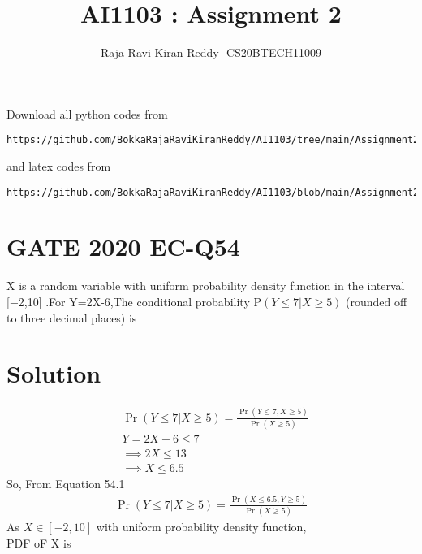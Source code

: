 \documentclass[journal,12pt,twocolumn]{IEEEtran}
\begin{document}
\let\vec\mathbf
\renewcommand{\thefigure}{\theproblem}
\def\putbox#1#2#3{\makebox[0in][l]{\makebox[#1][l]{}\raisebox{\baselineskip}[0in][0in]{\raisebox{#2}[0in][0in]{#3}}}}
     \def\rightbox#1{\makebox[0in][r]{#1}}
     \def\centbox#1{\makebox[0in]{#1}}
     \def\topbox#1{\raisebox{-\baselineskip}[0in][0in]{#1}}
     \def\midbox#1{\raisebox{-0.5\baselineskip}[0in][0in]{#1}}
\vspace{3cm}
\title{AI1103 : Assignment 2}
\author{Raja Ravi Kiran Reddy- CS20BTECH11009}
\maketitle
\newpage
\bigskip
\renewcommand{\thefigure}{\arabic{figure}}
\renewcommand{\thetable}{\arabic{table}}
Download all python codes from 
\begin{lstlisting}
https://github.com/BokkaRajaRaviKiranReddy/AI1103/tree/main/Assignment2/codes
\end{lstlisting}
%
and latex codes from 
%
\begin{lstlisting}
https://github.com/BokkaRajaRaviKiranReddy/AI1103/blob/main/Assignment2/Assignment2.tex
\end{lstlisting}
\section*{GATE 2020 EC-Q54}
X is a random variable with uniform probability density function in the interval
 [−2,10] .For Y=2X-6,The conditional probability P$(Y\leq7|X\geq5)$
(rounded off to three decimal places) is 
\section*{Solution}
\begin{align*}
\tag{54.1}
  &\Pr(Y\leq7|X\geq5)=\frac{\Pr(Y\leq7,X\geq5)}{\Pr(X\geq5)}\\
  &Y=2X-6\leq7\\
  &\implies 2X\leq13\\
  &\implies X\leq 6.5
\end{align*}
So,  From Equation 54.1
\begin{align}
   \tag{54.2}
   \Pr(Y\leq7|X\geq5)=\frac{\Pr(X\leq6.5,Y\geq5)}{\Pr(X\geq5)}
\end{align}
As $X\in [-2,10]$ with uniform probability density function,\\
PDF oF X is
\end{document}
